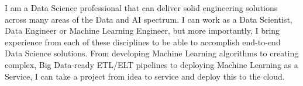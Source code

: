 I am a Data Science professional that can deliver solid engineering solutions across
many areas of the Data and AI spectrum. I can work as a Data Scientist,
Data Engineer or Machine Learning Engineer, but more importantly, I bring experience
from each of these disciplines to be able to accomplish end-to-end Data Science solutions.
From developing Machine Learning algorithms to creating complex, Big Data-ready ETL/ELT
pipelines to deploying Machine Learning as a Service, I can take a project from idea to
service and deploy this to the cloud.

